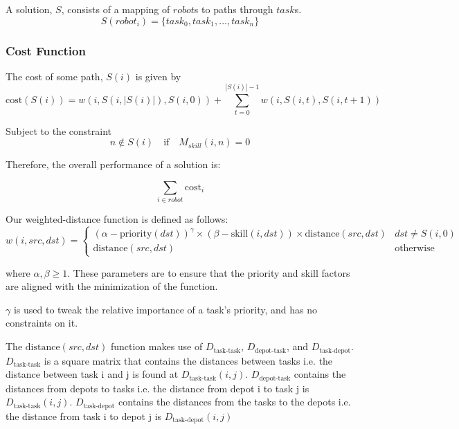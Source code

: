 \documentclass[a4paper]{article}
\begin{document}
A solution, $S$, consists of a mapping of $\mathit{robot}$s to paths through $\mathit{task}$s.
$$S(\mathit{robot}_i) = \{\mathit{task}_0, \mathit{task}_1, ..., \mathit{task}_n\}$$



\subsubsection{Cost Function}



The cost of some path, $S(i)$ is given by
$$
\text{cost}(S(i)) = w(i, S(i,|S(i)|), S(i,0)) + \sum_{t = 0}^{|S(i)|-1} w(i, S(i,t), S(i,t+1))
$$

Subject to the constraint
$$
n \notin S(i) \quad \text{if} \quad M_{skill}(i, n) = 0
$$

Therefore, the overall performance of a solution is:

$$
\sum_{i \in \mathit{robot}} \text{cost}_i
$$

Our weighted-distance function is defined as follows:
$$
w(i, \mathit{src}, \mathit{dst}) = \begin{cases}
(\alpha - \text{priority}(\mathit{dst}))^\gamma \times (\beta - \text{skill}(i, \mathit{dst})) \times \text{distance}(\mathit{src}, \mathit{dst}) & \mathit{dst} \ne S(i,0) \\
\text{distance}(\mathit{src}, \mathit{dst}) & \text{otherwise}
\end{cases}
$$

where $\alpha, \beta \geq 1$. These parameters are to ensure that the priority and skill factors are aligned with the minimization of the function.

$\gamma$ is used to tweak the relative importance of a task's priority, and has no constraints on it.

The $\text{distance}(\mathit{src}, \mathit{dst})$ function makes use of $D_\text{task-task}$, $D_\text{depot-task}$, and $D_\text{task-depot}$. $D_\text{task-task}$ is a square matrix that contains the distances between tasks i.e. the distance between task i and j is found at $D_\text{task-task}(i,j)$. $D_\text{depot-task}$ contains the distances from depots to tasks i.e. the distance from depot i to task j is $D_\text{task-task}(i,j)$. $D_\text{task-depot}$ contains the distances from the tasks to the depots i.e. the distance from task i to depot j is $D_\text{task-depot}(i,j)$
\end{document}
